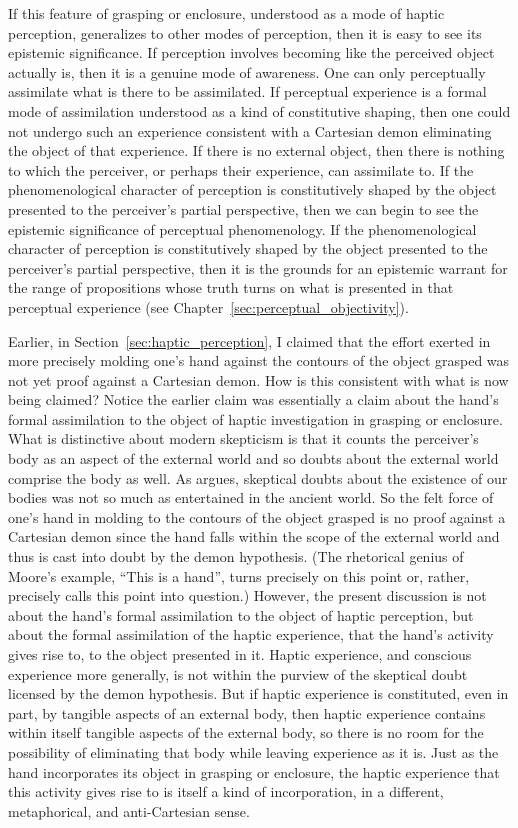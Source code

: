 If this feature of grasping or enclosure, understood as a mode of haptic perception, generalizes to other modes of perception, then it is easy to see its epistemic significance. If perception involves becoming like the perceived object actually is, then it is a genuine mode of awareness. One can only perceptually assimilate what is there to be assimilated. If perceptual experience is a formal mode of assimilation understood as a kind of constitutive shaping, then one could not undergo such an experience consistent with a Cartesian demon eliminating the object of that experience. If there is no external object, then there is nothing to which the perceiver, or perhaps their experience, can assimilate to. If the phenomenological character of perception is constitutively shaped by the object presented to the perceiver's partial perspective, then we can begin to see the epistemic significance of perceptual phenomenology. If the phenomenological character of perception is constitutively shaped by the object presented to the perceiver's partial perspective, then it is the grounds for an epistemic warrant for the range of propositions whose truth turns on what is presented in that perceptual experience (see Chapter~\ref{sec:perceptual_objectivity}).

Earlier, in Section~\ref{sec:haptic_perception}, I claimed that the effort exerted in more precisely molding one's hand against the contours of the object grasped was not yet proof against a Cartesian demon. How is this consistent with what is now being claimed? Notice the earlier claim was essentially a claim about the hand's formal assimilation to the object of haptic investigation in grasping or enclosure. What is distinctive about modern skepticism is that it counts the perceiver's body as an aspect of the external world and so doubts about the external world comprise the body as well. As \citet{Burnyeat:1982mz} argues, skeptical doubts about the existence of our bodies was not so much as entertained in the ancient world. So the felt force of one's hand in molding to the contours of the object grasped is no proof against a Cartesian demon since the hand falls within the scope of the external world and thus is cast into doubt by the demon hypothesis. (The rhetorical genius of Moore's \citeyear{Moore:1903uo} example, ``This is a hand'', turns precisely on this point or, rather, precisely calls this point into question.) However, the present discussion is not about the hand's formal assimilation to the object of haptic perception, but about the formal assimilation of the haptic experience, that the hand's activity gives rise to, to the object presented in it. Haptic experience, and conscious experience more generally, is not within the purview of the skeptical doubt licensed by the demon hypothesis. But if haptic experience is constituted, even in part, by tangible aspects of an external body, then haptic experience contains within itself tangible aspects of the external body, so there is no room for the possibility of eliminating that body while leaving experience as it is. Just as the hand incorporates its object in grasping or enclosure, the haptic experience that this activity gives rise to is itself a kind of incorporation, in a different, metaphorical, and anti-Cartesian sense. 

